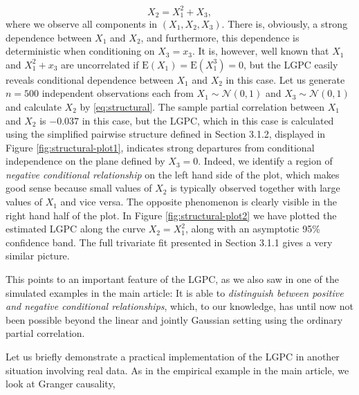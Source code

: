 \documentclass[
  12pt,
  letterpaper]{article}
\numberwithin{equation}{section}
\newcommand{\E}{\textrm{E}}
\begin{document}
\begin{equation}
X_2 = X_1^2 + X_3,
\label{eq:structural}
\end{equation}
where we observe all components in \((X_1, X_2, X_3)\). There is, obviously, a strong dependence between \(X_1\) and \(X_2\), and furthermore, this dependence is deterministic when conditioning on \(X_3 = x_3\). It is, however, well known that \(X_1\) and \(X_1^2 + x_3\) are uncorrelated if \(\E(X_1) = \E(X_1^3) = 0\), but the LGPC easily reveals conditional dependence between \(X_1\) and \(X_2\) in this case. Let us generate \(n = 500\) independent observations each from \(X_1 \sim \mathcal{N}(0,1)\) and \(X_3 \sim \mathcal{N}(0,1)\) and calculate \(X_2\) by \eqref{eq:structural}. The sample partial correlation between \(X_1\) and \(X_2\) is \(-0.037\) in this case, but the LGPC, which in this case is calculated using the simplified pairwise structure defined in Section 3.1.2, displayed in Figure \ref{fig:structural-plot1}, indicates strong departures from conditional independence on the plane defined by \(X_3 = 0\). Indeed, we identify a region of \emph{negative conditional relationship} on the left hand side of the plot, which makes good sense because small values of \(X_2\) is typically observed together with large values of \(X_1\) and vice versa. The opposite phenomenon is clearly visible in the right hand half of the plot. In Figure \ref{fig:structural-plot2} we have plotted the estimated LGPC along the curve \(X_2 = X_1^2\), along with an asymptotic 95\% confidence band. The full trivariate fit presented in Section 3.1.1 gives a very similar picture.

This points to an important feature of the LGPC, as we also saw in one of the simulated examples in the main article: It is able to \emph{distinguish between positive and negative conditional relationships}, which, to our knowledge, has until now not been possible beyond the linear and jointly Gaussian setting using the ordinary partial correlation.

Let us briefly demonstrate a practical implementation of the LGPC in another situation involving real data. As in the empirical example in the main article, we look at Granger causality,
\end{document}
